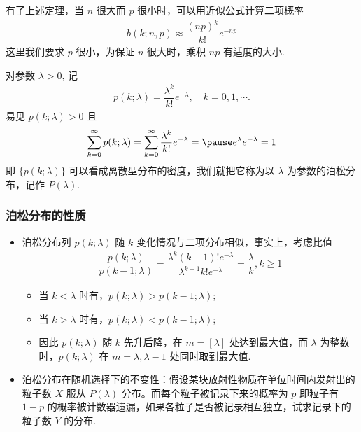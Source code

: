 \begin{frame}
	有了上述定理，当 $n$ 很大而 $p$ 很小时，可以用近似公式计算二项概率
	\begin{eqnarray*}
		b(k;n,p)\approx \dfrac{(np)^k}{k!}e^{-np}
	\end{eqnarray*}
	这里我们要求 $p$ 很小，为保证 $n$ 很大时，乘积 $np$ 有适度的大小.

	\pause  \begin{defi}[泊松分布] 对参数 $\lambda>0$, 记
		\begin{eqnarray*}
			p(k;\lambda)=\dfrac{\lambda^k}{k!}e^{-\lambda}, \quad k=0, 1,\cdots.
		\end{eqnarray*}
		\pause 易见 $p (k;\lambda)>0$ 且
		\begin{eqnarray*}
			\sum_{k=0}^\infty p(k;\lambda)=\sum_{k=0}^\infty \dfrac{\lambda^k}{k!}e^{-\lambda}=\pause e^\lambda e^{-\lambda}=1
		\end{eqnarray*}
		\pause 即 $\{p (k;\lambda)\}$ 可以看成离散型分布的密度，我们就把它称为以 $\lambda$ 为参数的泊松分布，记作 $P (\lambda)$.
	\end{defi}
\end{frame}
\begin{frame}
	\frametitle{泊松分布的性质}
	\begin{itemize}[<+-|alert@+>]
		\item 泊松分布列 $p (k;\lambda)$ 随 $k$ 变化情况与二项分布相似，事实上，考虑比值
		      \begin{eqnarray*}
			      \dfrac{p(k;\lambda)}{p(k-1;\lambda)}=\dfrac{\lambda^k(k-1)!e^{-\lambda}}{\lambda^{k-1}k!e^{-\lambda}}=\dfrac{\lambda}{k}, k\ge 1
		      \end{eqnarray*}
		      \begin{itemize}
			      \item 当 $k<\lambda$ 时有，$p (k;\lambda)>p (k-1;\lambda)$;
			      \item 当 $k>\lambda$ 时有，$p (k;\lambda)<p (k-1;\lambda)$;
			      \item 因此 $p (k;\lambda)$ 随 $k$ 先升后降，在 $m=[\lambda]$ 处达到最大值，而 $\lambda$ 为整数时，$p (k;\lambda)$ 在 $m=\lambda,\lambda-1$ 处同时取到最大值.
		      \end{itemize}
		\item 泊松分布在随机选择下的不变性：假设某块放射性物质在单位时间内发射出的粒子数 $X$ 服从 $P (\lambda)$ 分布。而每个粒子被记录下来的概率为 $p$ 即粒子有 $1-p$ 的概率被计数器遗漏，如果各粒子是否被记录相互独立，试求记录下的粒子数 $Y$ 的分布.
	\end{itemize}
\end{frame}
